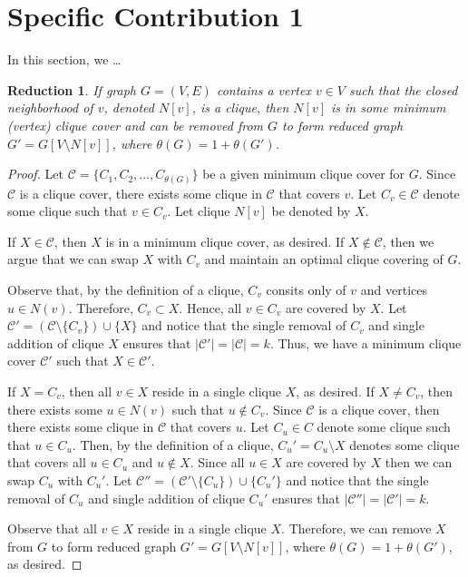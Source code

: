\documentclass[../techreport.tex]{subfiles}
\begin{document}
\newtheorem{reduction}{Reduction}
\newtheorem{claim}{Claim}

\section{Specific Contribution 1}
\label{sec:specific1}
In this section, we \ldots \\


\begin{reduction} 
	If graph $G = (V, E)$ contains a vertex $v \in V$ such that the closed neighborhood of $v$, denoted $N[v]$, is a clique, then $N[v]$ is in some minimum (vertex) clique cover and can be removed from $G$ to form reduced graph $G' = G[V \setminus N[v]]$, where $\theta(G) = 1 + \theta(G')$.
\end{reduction}

\begin{proof}
	Let $\mathcal{C} = \{C_1, C_2, \dots, C_{\theta(G)}\}$ be a given minimum clique cover for $G$. Since $\mathcal{C}$ is a clique cover, there exists some clique in $\mathcal{C}$ that covers $v$. Let $C_v \in \mathcal{C}$ denote some clique such that $v \in C_v$. Let clique $N[v]$ be denoted by $X$.

	If $X \in \mathcal{C}$, then $X$ is in a minimum clique cover, as desired. If $X \notin \mathcal{C}$, then we argue that we can swap $X$ with $C_v$ and maintain an optimal clique covering of $G$.

	Observe that, by the definition of a clique, $C_v$ consits only of $v$ and vertices $u \in N(v)$. Therefore, $C_v \subset X$. Hence, all $v \in C_v$ are covered by $X$. Let $\mathcal{C'} = (\mathcal{C} \setminus \{C_v\}) \cup \{X\}$ and notice that the single removal of $C_v$ and single addition of clique $X$ ensures that $|\mathcal{C'}| = |\mathcal{C}| = k$. Thus, we have a minimum clique cover $\mathcal{C'}$ such that $X \in \mathcal{C'}$.

	If $X = C_v$, then all $v \in X$ reside in a single clique $X$, as desired. If $X \neq C_v$, then there exists some $u \in N(v)$ such that $u \notin C_v$. Since $\mathcal{C}$ is a clique cover, then there exists some clique in $\mathcal{C}$ that covers $u$. Let $C_u \in C$ denote some clique such that $u \in C_u$. Then, by the definition of a clique, $C_u' = C_u \setminus X$ denotes some clique that covers all $u \in C_u$ and $u \notin X$. Since all $u \in X$ are covered by $X$ then we can swap $C_u$ with $C_u'$. Let $\mathcal{C''} = (\mathcal{C'} \setminus \{C_u\}) \cup \{C_u'\}$ and notice that the single removal of $C_u$ and single addition of clique $C_u'$ ensures that $|\mathcal{C''}| = |\mathcal{C'}| = k$.

	Observe that all $v \in X$ reside in a single clique $X$. Therefore, we can remove $X$ from $G$ to form reduced graph $G' = G[V \setminus N[v]]$, where $\theta(G) = 1 + \theta(G')$, as desired.
\end{proof}
\end{document}
